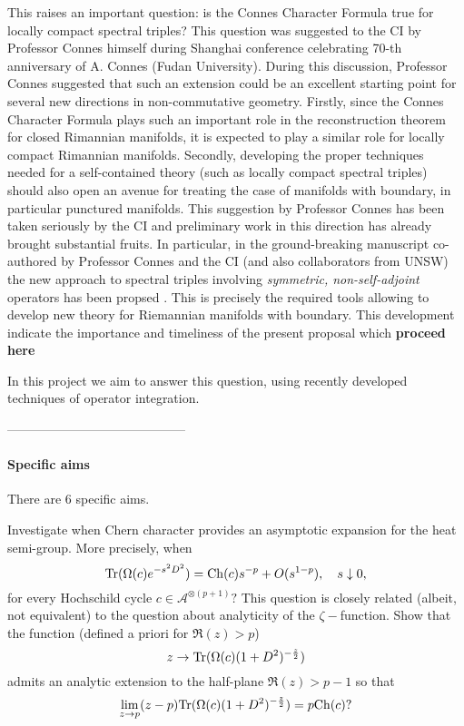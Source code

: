 \documentclass{article}
\begin{document}
This raises an important question: is the Connes Character Formula true for locally compact spectral triples? This question was suggested to the CI by Professor Connes himself during Shanghai conference celebrating 70-th anniversary of A. Connes (Fudan University). During this discussion, Professor Connes suggested that such an extension could be an excellent starting point for several new directions in non-commutative geometry. Firstly, since the Connes Character Formula plays such an important role in the reconstruction theorem for closed Rimannian manifolds, it is expected to play a similar role for locally compact Rimannian manifolds. Secondly, developing the proper techniques needed for a self-contained theory (such as locally compact spectral triples) should also open an avenue for treating the case of manifolds with boundary, in particular punctured manifolds. This suggestion by Professor Connes has been taken seriously by the CI and preliminary work in this direction has already brought substantial fruits. In particular, in the ground-breaking manuscript co-authored by Professor Connes and the CI (and also collaborators from UNSW) the new approach to spectral triples involving {\it symmetric, non-self-adjoint} operators has been propsed \cite{Connes_team_symmetric}. This is precisely the required tools allowing to develop new theory for Riemannian manifolds with boundary. This development indicate the importance and timeliness of the present proposal which {\bf proceed here}
    
    In this project we aim to answer this question, using recently developed techniques of operator integration.
    

------------------------------------------

\paragraph*{Specific aims} There are 6 specific aims.


 Investigate when Chern character provides an asymptotic expansion for the heat semi-group. More precisely, when 
\begin{equation}\label{heat eq}
{\rm Tr}(\Omega(c)e^{-s^2D^2})={\rm Ch}(c)s^{-p}+O(s^{1-p}),\quad s\downarrow0,
\end{equation}
for every Hochschild cycle $c\in\mathcal{A}^{\otimes (p+1)}?$ This question is closely related (albeit, not equivalent) to the question about analyticity of the $\zeta-$function. Show that the function (defined a priori for $\Re(z)>p$)
$$z\to {\rm Tr}(\Omega(c)(1+D^2)^{-\frac{z}{2}})$$
admits an analytic extension to the half-plane $\Re(z)>p-1$ so that
$$\lim_{z\to p}(z-p){\rm Tr}(\Omega(c)(1+D^2)^{-\frac{z}{2}})=p{\rm Ch}(c)?$$
\end{document}
